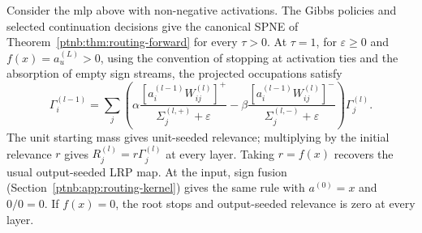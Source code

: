 \begin{theoremenv}\label{ptnb:thm:ab-recovery}\label{ptnb:thm:lrp-recovery}\label{thm:lrp_recovery}
Consider the \ac{mlp} above with non-negative activations. The Gibbs policies and selected continuation decisions give the canonical SPNE of Theorem~\ref{ptnb:thm:routing-forward} for every $\tau>0$. At $\tau=1$, for $\varepsilon\geq0$ and $f(x)=a_u^{(L)}>0$, using the convention of stopping at activation ties and the absorption of empty sign streams, the projected occupations satisfy
 \begin{equation}\label{ptnb:eq:lrp-eps-recovery}
 \Gamma_i^{(l-1)}=\sum_j\left(
 \alpha\frac{[a_i^{(l-1)}W_{ij}^{(l)}]^+}{\Sigma_j^{(l,+)}+\varepsilon}
 -\beta\frac{[a_i^{(l-1)}W_{ij}^{(l)}]^-}{\Sigma_j^{(l,-)}+\varepsilon}
 \right)\Gamma_j^{(l)}.
 \end{equation}
 The unit starting mass gives unit-seeded relevance; multiplying by the initial relevance $r$ gives $R_j^{(l)}=r\Gamma_j^{(l)}$ at every layer. Taking $r=f(x)$ recovers the usual output-seeded LRP map. At the input, sign fusion (Section~\ref{ptnb:app:routing-kernel}) gives the same rule with $a^{(0)}=x$ and $0/0=0$. If $f(x)=0$, the root stops and output-seeded relevance is zero at every layer.
\end{theoremenv}
